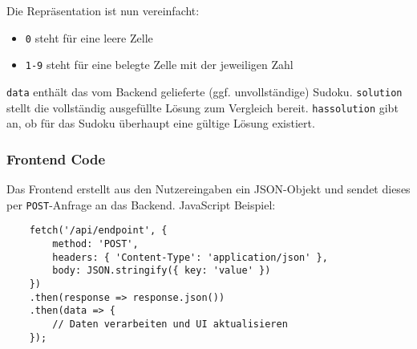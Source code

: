 Die Repräsentation ist nun vereinfacht:
\begin{itemize}
	\item \texttt{0} steht für eine leere Zelle
	\item \texttt{1-9} steht für eine belegte Zelle mit der jeweiligen Zahl
\end{itemize}

\texttt{data} enthält das vom Backend gelieferte (ggf. unvollständige) Sudoku.  
\texttt{solution} stellt die vollständig ausgefüllte Lösung zum Vergleich bereit.  
\texttt{hassolution} gibt an, ob für das Sudoku überhaupt eine gültige Lösung existiert.


\subsubsection{Frontend Code}
Das Frontend erstellt aus den Nutzereingaben ein JSON-Objekt und sendet dieses per \texttt{POST}-Anfrage an das Backend. JavaScript Beispiel:

\begin{verbatim}
	fetch('/api/endpoint', {
		method: 'POST',
		headers: { 'Content-Type': 'application/json' },
		body: JSON.stringify({ key: 'value' })
	})
	.then(response => response.json())
	.then(data => {
		// Daten verarbeiten und UI aktualisieren
	});
\end{verbatim}